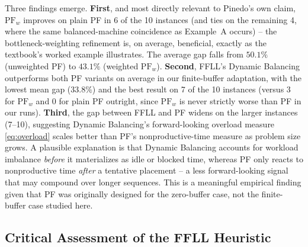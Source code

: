\documentclass[11pt,a4paper]{article}
\begin{document}
Three findings emerge. \textbf{First}, and most directly relevant to
Pinedo's own claim, $\mathrm{PF}_w$ improves on plain PF in 6 of the 10
instances (and ties on the remaining 4, where the same balanced-machine
coincidence as Example~A occurs) -- the bottleneck-weighting refinement
is, on average, beneficial, exactly as the textbook's worked example
illustrates. The average gap falls from $50.1\%$ (unweighted PF) to
$43.1\%$ (weighted $\mathrm{PF}_w$). \textbf{Second}, FFLL's Dynamic
Balancing outperforms both PF variants on average in our finite-buffer
adaptation, with the lowest mean gap ($33.8\%$) and the best result on 7
of the 10 instances (versus 3 for $\mathrm{PF}_w$ and 0 for plain PF
outright, since $\mathrm{PF}_w$ is never strictly worse than PF in our
runs). \textbf{Third}, the gap between FFLL and PF widens on the larger
instances (7--10), suggesting Dynamic Balancing's forward-looking
overload measure \eqref{eq:overload} scales better than PF's
nonproductive-time measure as problem size grows. A plausible explanation
is that Dynamic Balancing accounts for workload imbalance \emph{before}
it materializes as idle or blocked time, whereas PF only reacts to
nonproductive time \emph{after} a tentative placement -- a less
forward-looking signal that may compound over longer sequences. This is
a meaningful empirical finding given that PF was originally designed for
the zero-buffer case, not the finite-buffer case studied here.

\subsection{Critical Assessment of the FFLL Heuristic}
\end{document}
